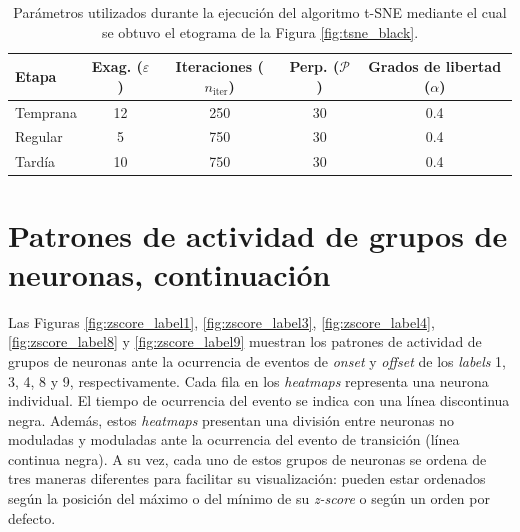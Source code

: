 \begin{table}[!htbp]
\begin{tabular}{lcccc}
\textbf{Etapa} & \textbf{Exag.} ($\varepsilon$) & \textbf{Iteraciones} ($n_{\mathrm{iter}}$) & \textbf{Perp.} ($\mathcal{P}$) & \textbf{Grados de libertad} ($\alpha$) \\ \hline
Temprana & 12 & 250 & 30 & 0.4 \\
Regular & 5 & 750 & 30 & 0.4 \\
Tardía & 10 & 750 & 30 & 0.4 \\
\end{tabular}
\caption{ Parámetros utilizados durante la ejecución del algoritmo t-SNE mediante el cual se obtuvo el etograma de la Figura \ref{fig:tsne_black}.}
\label{tab:tsne_param}
\end{table}

\chapter{Patrones de actividad de grupos de neuronas, continuación}\label{cha:popu_cont}

Las Figuras \ref{fig:zscore_label1}, \ref{fig:zscore_label3}, \ref{fig:zscore_label4}, \ref{fig:zscore_label8} y \ref{fig:zscore_label9} muestran los patrones de actividad de grupos de neuronas ante la ocurrencia de eventos de \textit{onset} y \textit{offset} de los \textit{labels} 1, 3, 4, 8 y 9, respectivamente. Cada fila en los \textit{heatmaps} representa una neurona individual. El tiempo de ocurrencia del evento se indica con una línea discontinua negra. Además, estos \textit{heatmaps} presentan una división entre neuronas no moduladas y moduladas ante la ocurrencia del evento de transición (línea continua negra). A su vez, cada uno de estos grupos de neuronas se ordena de tres maneras diferentes para facilitar su visualización: pueden estar ordenados según la posición del máximo o del mínimo de su \textit{z-score} o según un orden por defecto.

